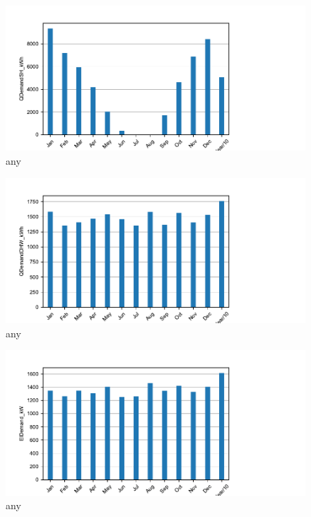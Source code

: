 \documentclass[english]{SPFShortReportIndex}
\begin{document}
\begin{figure}[!ht]
\begin{center}
\includegraphics[width=1\textwidth]{QDemandSH_kWh.pdf}
\caption{any}
\label{QDemandSH_kWh}
\end{center}
\end{figure}
\begin{figure}[!ht]
\begin{center}
\includegraphics[width=1\textwidth]{QDemandDHW_kWh.pdf}
\caption{any}
\label{QDemandDHW_kWh}
\end{center}
\end{figure}
\begin{figure}[!ht]
\begin{center}
\includegraphics[width=1\textwidth]{ElDemand_kW.pdf}
\caption{any}
\label{ElDemand_kW}
\end{center}
\end{figure}
\end{document}
